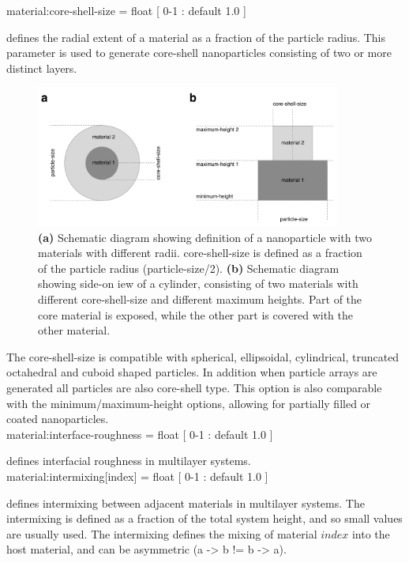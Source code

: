 {\zicf material:core-shell-size = float [ 0-1 : default 1.0 ]} defines the radial extent of a material as a fraction of the particle radius. This parameter is used to generate core-shell nanoparticles consisting of two or more distinct layers.
\begin{figure}[!htb]
\center
\includegraphics[width=10cm]{figures/core-shell.pdf}
\caption{\textbf{(a)} Schematic diagram showing definition of a nanoparticle with two materials with different radii. core-shell-size is defined as a fraction of the particle radius (particle-size/2). \textbf{(b)} Schematic diagram showing side-on iew of a cylinder, consisting of two materials with different core-shell-size and different maximum heights. Part of the core material is exposed, while the other part is covered with the other material.}
\label{fig:multilayer}
\end{figure}
The core-shell-size is compatible with spherical, ellipsoidal, cylindrical, truncated octahedral and cuboid shaped particles. In addition when particle arrays are generated all particles are also core-shell type. This option is also comparable with the minimum/maximum-height options, allowing for partially filled or coated nanoparticles.\\

{\zicf material:interface-roughness = float [ 0-1 : default 1.0 ]} defines interfacial roughness in multilayer systems.\\

{\zicf material:intermixing[index] = float [ 0-1 : default 1.0 ]} defines intermixing between adjacent materials in multilayer systems. The intermixing is defined as a fraction of the total system height, and so small values are usually used. The intermixing defines the mixing of material $index$ into the host material, and can be asymmetric (a -> b != b -> a).\\

